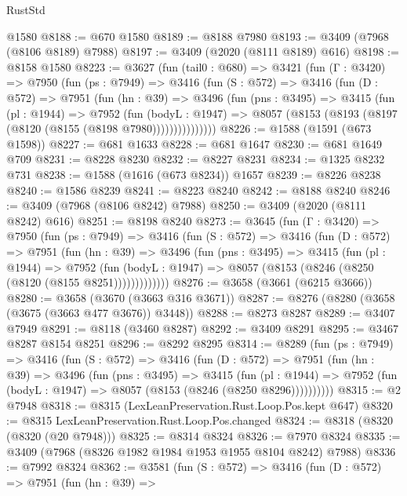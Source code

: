 \begin{lexlean}{RustStd}
\begin{coremodule}
    @1580
@8188 := @670 @1580
@8189 := @8188 @7980
@8193 := @3409 (@7968 (@8106 @8189) @7988)
@8197 := @3409 (@2020 (@8111 @8189) @616)
@8198 := @8158 @1580
@8223 := @3627
    (fun (tail0 : @680) =>
    @3421
      (fun (Γ : @3420) =>
      @7950
        (fun (ps : @7949) =>
        @3416
          (fun (S : @572) =>
          @3416
            (fun (D : @572) =>
            @7951
              (fun (hn : @39) =>
              @3496
                (fun (pns : @3495) =>
                @3415
                  (fun (pl : @1944) =>
                  @7952
                    (fun (bodyL : @1947) =>
                    @8057 (@8153 (@8193 (@8197 (@8120 (@8155 (@8198 @7980)))))))))))))))
@8226 := @1588 (@1591 (@673 @1598))
@8227 := @681 @1633
@8228 := @681 @1647
@8230 := @681 @1649 @709
@8231 := @8228 @8230
@8232 := @8227 @8231
@8234 := @1325 @8232 @731
@8238 := @1588 (@1616 (@673 @8234)) @1657
@8239 := @8226 @8238
@8240 := @1586 @8239
@8241 := @8223 @8240
@8242 := @8188 @8240
@8246 := @3409 (@7968 (@8106 @8242) @7988)
@8250 := @3409 (@2020 (@8111 @8242) @616)
@8251 := @8198 @8240
@8273 := @3645
    (fun (Γ : @3420) =>
    @7950
      (fun (ps : @7949) =>
      @3416
        (fun (S : @572) =>
        @3416
          (fun (D : @572) =>
          @7951
            (fun (hn : @39) =>
            @3496
              (fun (pns : @3495) =>
              @3415
                (fun (pl : @1944) =>
                @7952
                  (fun (bodyL : @1947) =>
                  @8057 (@8153 (@8246 (@8250 (@8120 (@8155 @8251)))))))))))))
@8276 := @3658 (@3661 (@6215 @3666))
@8280 := @3658 (@3670 (@3663 @316 @3671))
@8287 := @8276 (@8280 (@3658 (@3675 (@3663 @477 @3676)) @3448))
@8288 := @8273 @8287
@8289 := @3407 @7949
@8291 := @8118 (@3460 @8287)
@8292 := @3409 @8291
@8295 := @3467 @8287 @8154 @8251
@8296 := @8292 @8295
@8314 := @8289
    (fun (ps : @7949) =>
    @3416
      (fun (S : @572) =>
      @3416
        (fun (D : @572) =>
        @7951
          (fun (hn : @39) =>
          @3496
            (fun (pns : @3495) =>
            @3415
              (fun (pl : @1944) =>
              @7952 (fun (bodyL : @1947) => @8057 (@8153 (@8246 (@8250 @8296))))))))))
@8315 := @2 @7948
@8318 := @8315 (LexLeanPreservation.Rust.Loop.Pos.kept @647)
@8320 := @8315 LexLeanPreservation.Rust.Loop.Pos.changed
@8324 := @8318 (@8320 (@8320 (@20 @7948)))
@8325 := @8314 @8324
@8326 := @7970 @8324
@8335 := @3409 (@7968 (@8326 @1982 @1984 @1953 @1955 @8104 @8242) @7988)
@8336 := @7992 @8324
@8362 := @3581
    (fun (S : @572) =>
    @3416
      (fun (D : @572) =>
      @7951
        (fun (hn : @39) =>

\end{coremodule}
\end{lexlean}
